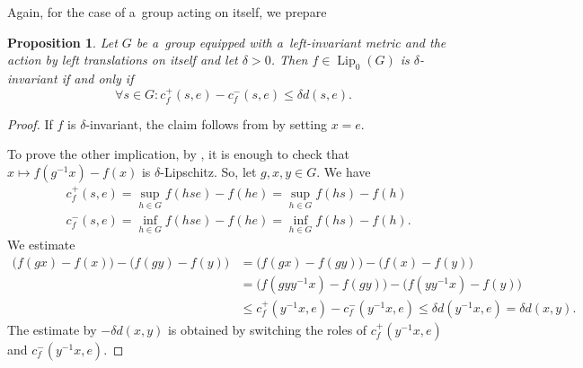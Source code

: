 \documentclass[11pt,a4paper]{amsart}
\newtheorem{proposition}[theorem]{Proposition}
\theoremstyle{definition}
\newcommand{\Lipz}{\operatorname{Lip}_0}
\begin{document}
	Again, for the case of a~group acting on itself, we prepare
	
	\begin{proposition} \label{prop:deltaInvEquivToDeltaC}
		Let $G$ be a~group equipped with a~left-invariant metric and the action by left translations on itself and let $\delta > 0$. Then $f \in \Lipz(G)$ is $\delta$-invariant if and only if
		\begin{equation*}
			\forall s \in G: c_f^+(s, e) - c_f^-(s, e) \leq \delta d(s, e).
		\end{equation*}
	\end{proposition}
	\begin{proof}
		If $f$ is $\delta$-invariant, the claim follows from  by setting $x = e$.
		
		To prove the other implication, by , it is enough to check that $x \mapsto f(g^{-1}x) - f(x)$ is $\delta$-Lipschitz. So, let $g,x,y \in G$. We have
		\begin{align*}
			&c_f^+(s, e) = \sup_{h\in G} f(hse) - f(he) = \sup_{h\in G} f(hs) - f(h)\\
			&c_f^-(s, e) = \inf_{h\in G} f(hse) - f(he) = \inf_{h\in G} f(hs) - f(h).
		\end{align*}
		We estimate
		\begin{align*}
			\big(f(gx) - f(x)\big) - \big(f(gy) - f(y)\big)
			&= \big(f(gx) - f(gy)\big) - \big(f(x) - f(y)\big)\\
			&=\big(f(gyy^{-1}x) - f(gy)\big) - \big(f(yy^{-1}x) - f(y)\big)\\
			& \leq c_f^+(y^{-1}x, e) - c_f^-(y^{-1}x, e) \leq \delta d(y^{-1}x, e) = \delta d(x, y).
		\end{align*}
		The estimate by $-\delta d(x, y)$ is obtained by switching the roles of $c_f^+(y^{-1}x, e)$ and $c_f^-(y^{-1}x, e)$.
	\end{proof}
	
\end{document}
